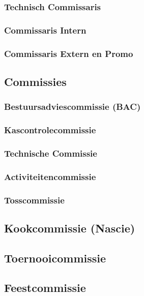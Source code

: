 \documentclass[]{article}
\begin{document}
\subsubsection{Technisch Commissaris}

\subsubsection{Commissaris Intern}

\subsubsection{Commissaris Extern en Promo}

\subsection{Commissies}
\subsubsection{Bestuursadviescommissie (BAC)}

\subsubsection{Kascontrolecommissie}

\subsubsection{Technische Commissie}

\subsubsection{Activiteitencommissie}

\subsubsection{Tosscommissie}

\subsection{Kookcommissie (Nascie)}

\subsection{Toernooicommissie}

\subsection{Feestcommissie}
\end{document}

